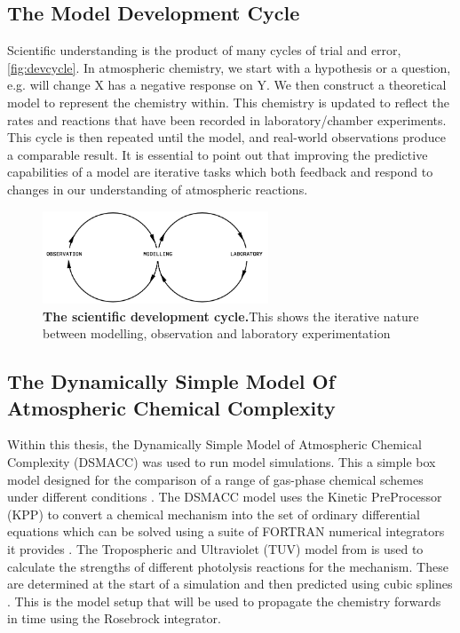 \subsection{The Model Development Cycle}
Scientific understanding is the product of many cycles of trial and error, \autoref{fig:devcycle}. In atmospheric chemistry, we start with a hypothesis or a question, e.g. will change X has a negative response on Y. We then construct a theoretical model to represent the chemistry within. This chemistry is updated to reflect the rates and reactions that have been recorded in laboratory/chamber experiments. This cycle is then repeated until the model, and real-world observations produce a comparable result.
It is essential to point out that improving the predictive capabilities of a model are iterative tasks which both feedback and respond to changes in our understanding of atmospheric reactions.



\begin{figure}[H]
    \centering
    \includegraphics[width=0.6\textwidth]{devcycle.png}
    \caption{\textbf{The scientific development cycle.}This shows the iterative nature between modelling, observation and laboratory experimentation}
    \label{fig:devcycle}
\end{figure}

 \subsection{The Dynamically Simple Model Of Atmospheric Chemical Complexity}

Within this thesis, the Dynamically Simple Model of Atmospheric Chemical Complexity (DSMACC) was used to run model simulations. This a simple box model designed for the comparison of a range of gas-phase chemical schemes under different conditions \citep{dsmacc}.
 The DSMACC model uses the Kinetic PreProcessor (KPP) to convert a chemical mechanism into the set of ordinary differential equations which can be solved using a suite of FORTRAN numerical integrators it provides \citep{kpp}. The Tropospheric and Ultraviolet (TUV) model from \cite{tuv} is used to calculate the strengths of different photolysis reactions for the mechanism. These are determined at the start of a simulation and then predicted using cubic splines \citep{dsmaccgit}. This is the model setup that will be used to propagate the chemistry forwards in time using the Rosebrock integrator.


